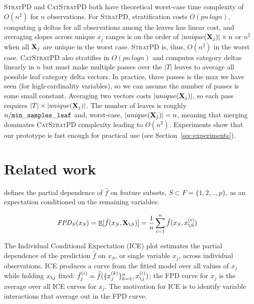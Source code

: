 \documentclass[smallextended]{svjour3}       %
\newcommand{\secref}[1]{Section~\ref{#1}}
\newcommand{\cut}[1]{}
\newcommand{\spd}{\fontfamily{cmr}\textsc{\small StratPD}}
\newcommand{\cspd}{\fontfamily{cmr}\textsc{\small CatStratPD}}
\newcommand{\xnj}{$x_{\texttt{\char`\\} j}$}
\renewcommand{\slash}{\texttt{\char`\\}}
\DeclareMathOperator{\Ex}{\mathbb{E}}
\begin{document}
\spd{} and \cspd{} both have theoretical worst-case time complexity of $O(n^2)$ for $n$ observations. For \spd{}, stratification costs $O(p n \,log n)$, computing $y$ deltas for all observations among the leaves has linear cost, and averaging slopes across unique $x_j$ ranges is on the order of $|unique({\bf X}_j)| \times n$ or $n^2$ when all ${\bf X}_j$ are unique in the worst case. \spd{} is, thus, $O(n^2)$ in the worst case.  \cspd{} also stratifies in $O(p n \,log n)$ and computes category deltas linearly in $n$ but must make multiple passes over the $|T|$ leaves to average all possible leaf category delta vectors.  In practice, three passes is the max we have seen (for high-cardinality variables), so we can assume the number of passes is some small constant. Averaging two vectors costs $|unique({\bf X}_j)|$, so each pass requires $|T| \times |unique({\bf X}_j)|$. The number of leaves is roughly $n / {\tt\small min\_samples\_leaf}$ and, worst-case, $|unique({\bf X}_j)|=n$, meaning that merging dominates \cspd{} complexity leading to $O(n^2)$.  Experiments show that our prototype is fast enough for practical use (see \secref{sec:experiments}).

\section{Related work}\label{sec:related}

\cite{PDP} defines the partial dependence of $\hat{f}$ on feature subsets, $S \subset F = \{1, 2, .., p\}$, as an expectation conditioned on the remaining variables:\vspace{-2mm}

\begin{equation}
{\it FPD}_S(x_S) = \Ex[\hat{f}(x_S,{\bf X}_{\slash S})] = \frac{1}{n} \sum_{i=1}^n \hat{f}(x_S, x_{\slash S}^{(i)})
\end{equation}\vspace{-2mm}

\cut{
\[
{\it FPD}_j(x_j=z) = \Ex[\hat{f}(x_{j}=z,{\bf X}_{\slash j})] = \frac{1}{n} \sum_{i=1}^n \hat{f}(x_j=z, x_{\slash j}^{(i)})
\]
}

\cut{
\noindent FPD replaces ${\bf X}_j$ with $z$ then computes the average model output for the altered $x^{(i)}$.
}


The Individual Conditional Expectation (ICE) plot \cite{ICE} estimates the partial dependence of the prediction $\hat{f}$ on $x_S$, or single variable $x_j$, across individual observations. ICE produces a curve from the fitted model over all values of $x_j$ while holding \xnj{} fixed: $\hat{f}^{(i)}_j = \widehat{f}(\{x_j^{(k)}\}_{k = 1}^n, x_{\slash j}^{(i)})$;  the FPD curve for  $x_j$ is the average over all ICE curves for $x_j$. The motivation for ICE is to identify variable interactions that average out in the FPD curve. 
\end{document}
